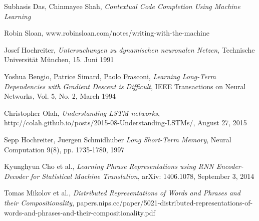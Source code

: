 \begin{thebibliography}{9}

    Subhasis Das, Chinmayee Shah,
    \textit{Contextual Code Completion Using Machine Learning}

     Robin Sloan,
     www.robinsloan.com/notes/writing-with-the-machine

     Josef Hochreiter,
     \textit{Untersuchungen zu dynamischen neuronalen Netzen},
     Technische Universität München,
     15. Juni 1991

     Yoshua Bengio, Patrice Simard, Paolo Frasconi,
     \textit{Learning Long-Term Dependencies with Gradient Descent is Difficult},
     IEEE Transactions on Neural Networks,
     Vol. 5, No. 2, March 1994

     Christopher Olah,
     \textit{Understanding LSTM networks},
     http://colah.github.io/posts/2015-08-Understanding-LSTMs/,
     August 27, 2015

     Sepp Hochreiter, Juergen Schmidhuber
    \textit{Long Short-Term Memory},
     Neural Computation 9(8), pp. 1735-1780, 1997

	Kyunghyun Cho et al.,
	\textit{Learning Phrase Representations using RNN Encoder-Decoder for Statistical Machine Translation},
	arXiv: 1406.1078,
	September 3, 2014

    Tomas Mikolov et al.,
	\textit{Distributed Representations of Words and Phrases and their Compositionality},
	papers.nips.cc/paper/5021-distributed-representations-of-words-and-phrases-and-their-compositionality.pdf

\end{thebibliography}
